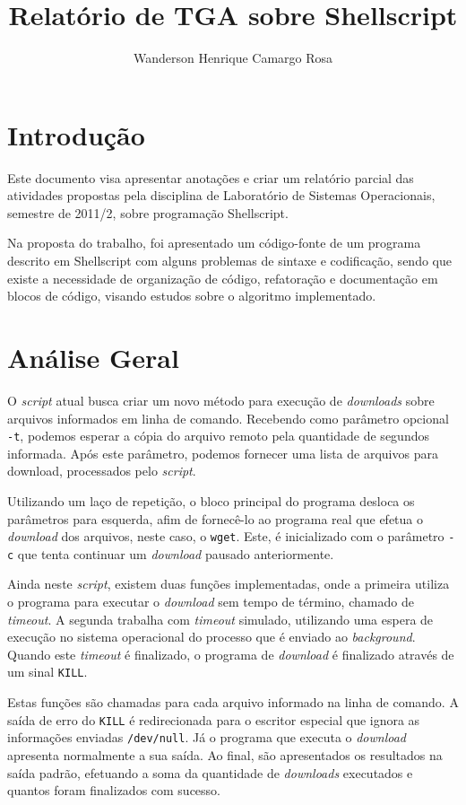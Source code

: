 \documentclass{article}
\title{Relatório de TGA sobre Shellscript}
\author{Wanderson Henrique Camargo Rosa\inst{1}}
\begin{document}
\maketitle{}

\section{Introdução}

Este documento visa apresentar anotações e criar um relatório parcial das
atividades propostas pela disciplina de Laboratório de Sistemas Operacionais,
semestre de 2011/2, sobre programação Shellscript.

Na proposta do trabalho, foi apresentado um código-fonte de um programa descrito
em Shellscript com alguns problemas de sintaxe e codificação, sendo que existe a
necessidade de organização de código, refatoração e documentação em blocos de
código, visando estudos sobre o algoritmo implementado.

\section{Análise Geral}

O \textit{script} atual busca criar um novo método para execução de
\textit{downloads} sobre arquivos informados em linha de comando. Recebendo como
parâmetro opcional \texttt{-t}, podemos esperar a cópia do arquivo remoto pela
quantidade de segundos informada. Após este parâmetro, podemos fornecer uma
lista de arquivos para download, processados pelo \textit{script}.

Utilizando um laço de repetição, o bloco principal do programa desloca os
parâmetros para esquerda, afim de fornecê-lo ao programa real que efetua o
\textit{download} dos arquivos, neste caso, o \texttt{wget}. Este, é
inicializado com o parâmetro \texttt{-c} que tenta continuar um
\textit{download} pausado anteriormente.

Ainda neste \textit{script}, existem duas funções implementadas, onde a primeira
utiliza o programa para executar o \textit{download} sem tempo de término,
chamado de \textit{timeout}. A segunda trabalha com \textit{timeout} simulado,
utilizando uma espera de execução no sistema operacional do processo que é
enviado ao \textit{background}. Quando este \textit{timeout} é finalizado, o
programa de \textit{download} é finalizado através de um sinal \texttt{KILL}.

Estas funções são chamadas para cada arquivo informado na linha de comando. A
saída de erro do \texttt{KILL} é redirecionada para o escritor especial que
ignora as informações enviadas \texttt{/dev/null}. Já o programa que executa o
\textit{download} apresenta normalmente a sua saída. Ao final, são apresentados
os resultados na saída padrão, efetuando a soma da quantidade de
\textit{downloads} executados e quantos foram finalizados com sucesso.
\end{document}

